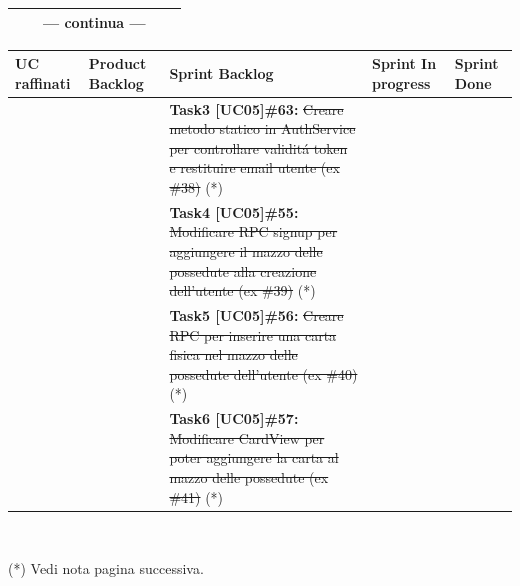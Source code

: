 \documentclass[a4paper, oneside]{article}
\begin{document}
\begin{landscape}
\begin{tabular}{ | p{6cm} | p{3.2cm} | p{7.8cm} | p{3.6cm} | p{2.2cm}| }
            \hline
            & & --- continua --- & & \\
            \hline
        \end{tabular}

        \newpage
        \noindent
        \begin{tabular}{ | p{6cm} | p{3.2cm} | p{7.8cm} | p{3.6cm} | p{2.2cm}| }
            \hline
            \textbf{UC raffinati}
            & \textbf{Product Backlog}
            & \textbf{Sprint Backlog}
            & \textbf{Sprint In progress}
            & \textbf{Sprint Done} \\
            \hline
            \hline
            & & \textbf{Task3 [UC05]\#63:} \st{Creare metodo statico in AuthService per controllare validit\'{a} token e restituire email utente (ex \#38)}  (*)   & & \\
            \hline
            & & \textbf{Task4 [UC05]\#55:} \st{Modificare RPC signup per aggiungere il mazzo delle possedute alla creazione dell'utente (ex \#39)}  (*)  & & \\
            \hline
            & & \textbf{Task5 [UC05]\#56:} \st{Creare RPC per inserire una carta fisica nel mazzo delle possedute dell'utente (ex \#40)}  (*)   & & \\
            \hline
            & & \textbf{Task6 [UC05]\#57:} \st{Modificare CardView per poter aggiungere la carta al mazzo delle possedute (ex \#41)}  (*)   & & \\
            \hline
        \end{tabular}
        \\
        \begin{flushright}
        (*) Vedi nota pagina successiva.
        \end{flushright}

        \newpage
        \normalsize

\end{landscape}
\end{document}
